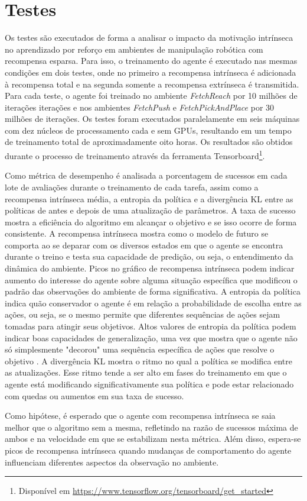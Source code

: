 
\section{Testes}
\label{sec:testes}

Os testes são executados de forma a analisar o impacto da motivação intrínseca no aprendizado por reforço em ambientes de manipulação robótica com recompensa esparsa. Para isso, o treinamento do agente é executado nas mesmas condições em dois testes, onde no primeiro a recompensa intrínseca é adicionada à recompensa total e na segunda somente a recompensa extrínseca é transmitida. Para cada teste, o agente foi treinado no ambiente \textit{FetchReach} por 10 milhões de iterações iterações e nos ambientes \textit{FetchPush} e \textit{FetchPickAndPlace} por 30 milhões de iterações. Os testes foram executados paralelamente em seis máquinas com dez núcleos de processamento cada e sem GPUs, resultando em um tempo de treinamento total de aproximadamente oito horas. Os resultados são obtidos durante o processo de treinamento através da ferramenta Tensorboard\footnote{Disponível em \url{https://www.tensorflow.org/tensorboard/get\_started}}.

Como métrica de desempenho é analisada a porcentagem de sucessos em cada lote de avaliações durante o treinamento de cada tarefa, assim como a recompensa intrínseca média, a entropia da política e a divergência KL entre as políticas de antes e depois de uma atualização de parâmetros. A taxa de sucesso mostra a eficiência do algoritmo em alcançar o objetivo e se isso ocorre de forma consistente. A recompensa intrínseca mostra como o modelo de futuro se comporta ao se deparar com os diversos estados em que o agente se encontra durante o treino e testa sua capacidade de predição, ou seja, o entendimento da dinâmica do ambiente. Picos no gráfico de recompensa intrínseca podem indicar aumento do interesse do agente sobre alguma situação específica que modificou o padrão das observações do ambiente de forma significativa. A entropia da política indica quão conservador o agente é em relação a probabilidade de escolha entre as ações, ou seja, se o mesmo permite que diferentes sequências de ações sejam tomadas para atingir seus objetivos. Altos valores de entropia da política podem indicar boas capacidades de generalização, uma vez que mostra que o agente não só simplesmente "decorou" uma sequência específica de ações que resolve o objetivo \cite{williamspeng}. A divergência KL mostra o ritmo no qual a política se modifica entre as atualizações. Esse ritmo tende a ser alto em fases do treinamento em que o agente está modificando significativamente sua política e pode estar relacionado com quedas ou aumentos em sua taxa de sucesso.

Como hipótese, é esperado que o agente com recompensa intrínseca se saia melhor que o algoritmo sem a mesma, refletindo na razão de sucessos máxima de ambos e na velocidade em que se estabilizam nesta métrica. Além disso, espera-se picos de recompensa intrínseca quando mudanças de comportamento do agente influenciam diferentes aspectos da observação no ambiente.